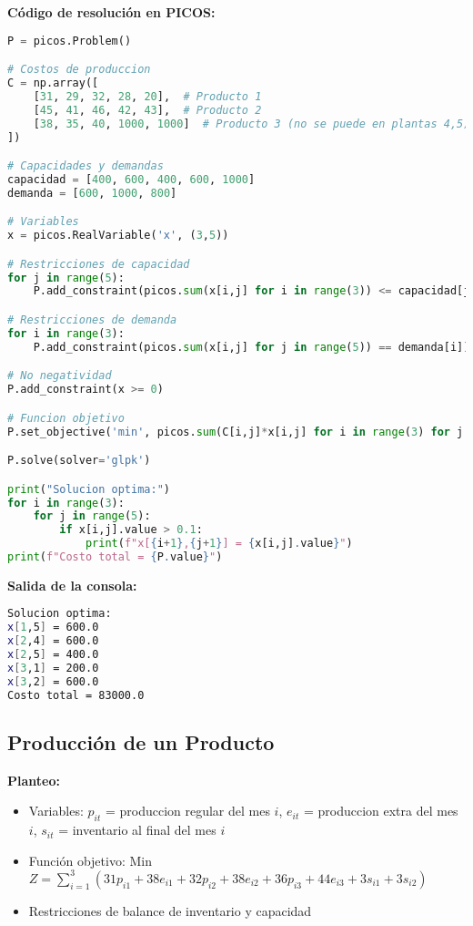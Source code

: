 \documentclass[12pt]{article}
\begin{document}
\textbf{Código de resolución en PICOS:}
\begin{lstlisting}[language=Python]
P = picos.Problem()

# Costos de produccion
C = np.array([
    [31, 29, 32, 28, 20],  # Producto 1
    [45, 41, 46, 42, 43],  # Producto 2
    [38, 35, 40, 1000, 1000]  # Producto 3 (no se puede en plantas 4,5)
])

# Capacidades y demandas
capacidad = [400, 600, 400, 600, 1000]
demanda = [600, 1000, 800]

# Variables
x = picos.RealVariable('x', (3,5))

# Restricciones de capacidad
for j in range(5):
    P.add_constraint(picos.sum(x[i,j] for i in range(3)) <= capacidad[j])

# Restricciones de demanda
for i in range(3):
    P.add_constraint(picos.sum(x[i,j] for j in range(5)) == demanda[i])

# No negatividad
P.add_constraint(x >= 0)

# Funcion objetivo
P.set_objective('min', picos.sum(C[i,j]*x[i,j] for i in range(3) for j in range(5)))

P.solve(solver='glpk')

print("Solucion optima:")
for i in range(3):
    for j in range(5):
        if x[i,j].value > 0.1:
            print(f"x[{i+1},{j+1}] = {x[i,j].value}")
print(f"Costo total = {P.value}")
\end{lstlisting}

\textbf{Salida de la consola:}
\begin{lstlisting}[language=bash,backgroundcolor=\color{black},basicstyle=\color{white}\ttfamily,numbers=none]
Solucion optima:
x[1,5] = 600.0
x[2,4] = 600.0
x[2,5] = 400.0
x[3,1] = 200.0
x[3,2] = 600.0
Costo total = 83000.0
\end{lstlisting}

\subsection{Producción de un Producto}

\textbf{Planteo:}
\begin{itemize}
\item Variables: $p_{it}$ = produccion regular del mes $i$, $e_{it}$ = produccion extra del mes $i$, $s_{it}$ = inventario al final del mes $i$
\item Función objetivo: Min $Z = \sum_{i=1}^3 (31p_{i1} + 38e_{i1} + 32p_{i2} + 38e_{i2} + 36p_{i3} + 44e_{i3} + 3s_{i1} + 3s_{i2})$
\item Restricciones de balance de inventario y capacidad
\end{itemize}
\end{document}
